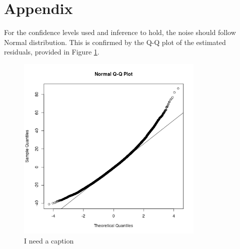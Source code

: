 \documentclass[12pt]{article}
\begin{document}
\appendix

\section{Appendix}

For the confidence levels used and inference to hold,
the noise should follow Normal distribution.
This is confirmed by the Q-Q plot of the estimated residuals,
provided in Figure \ref{qq}.

\begin{figure}[h!]
	\centering
	\includegraphics[width = 0.8\textwidth]
	{../figure/unnamed-chunk-2-1}
	\caption{I need a caption}
	\label{qq}
\end{figure}
\end{document}
